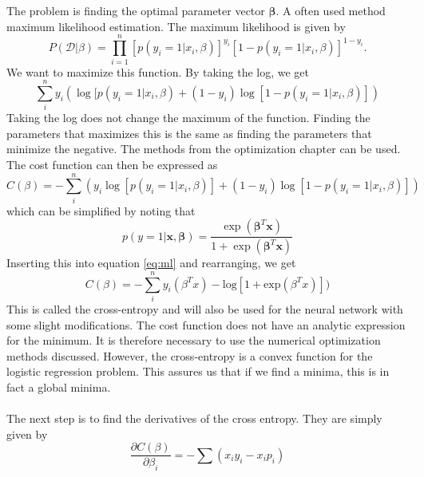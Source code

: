 \\
\\
The problem is finding the optimal parameter vector $\boldsymbol{\beta}$. A often used method  maximum likelihood estimation. 
The maximum likelihood is given by 
\begin{equation}
   P(\mathcal{D|\beta}) = \prod_{i=1}^n[p(y_i = 1|x_i, \beta)]^{y_i}[1 - p(y_i = 1|x_i, \beta)]^{1 - y_i}.
\end{equation} \cite{hastie}
We want to maximize this function. By taking the log, we get 
\begin{equation}
    \sum_i^n y_i \left(\log[p(y_i=1|x_i, \beta) + (1-y_i)\log [1 - p(y_i = 1|x_i, \beta)]\right)
\end{equation}
Taking the log does not change the maximum of the function. Finding the parameters that maximizes this is the same as finding the parameters that minimize the negative. The methods from the optimization chapter can be used. The cost function can then be expressed as
\begin{equation}
   C(\beta) =  -\sum_i^n \left( y_i \log[p(y_i=1|x_i, \beta)] + (1-y_i)\log [1 - p(y_i = 1|x_i, \beta)]\right)
   \label{eq:ml}
\end{equation}
which can be simplified by noting that 
\begin{equation}
    p(y=1|\boldsymbol{x}, \boldsymbol{\beta}) = \frac{\exp (\boldsymbol{\beta}^T\boldsymbol{x})}{1 + \exp (\boldsymbol{\beta}^T\boldsymbol{x}) }
\end{equation}
Inserting this into equation \ref{eq:ml} and rearranging, we get
\begin{equation}
    C(\beta) = - \sum_i^n y_i (\beta^T x) -\text{log}[1 + \text{exp}(\beta^T x)])
\end{equation}
This is called the cross-entropy and will also be used for the neural network with some slight modifications. The cost function does not have an analytic expression for the minimum. It is therefore necessary to use the numerical optimization methods discussed. However, the cross-entropy is a convex function for the logistic regression problem.\cite{hastie} This assures us that if we find a minima, this is in fact a global minima.\\
\\
The next step is to find the derivatives of the cross entropy. They are simply given by
\begin{equation}
    \frac{\partial C(\beta)}{\partial \beta_i} = - \sum \left( x_i y_i - x_ip_i \right)
\end{equation}
